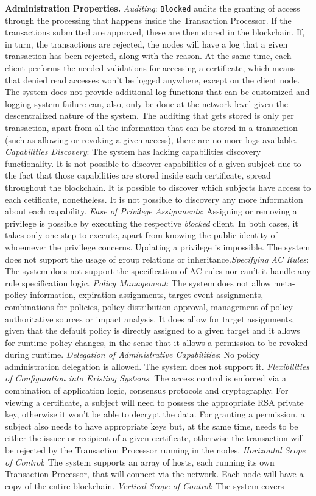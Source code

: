 \textbf{Administration Properties.} \emph{Auditing}: \texttt{Blocked} audits the granting of access through the processing that happens inside the Transaction Processor. If the transactions submitted are approved, these are then stored in the blockchain. If, in turn, the transactions are rejected, the nodes will have a log that a given transaction has been rejected, along with the reason. At the same time, each client performs the needed validations for accessing a certificate, which means that denied read accesses won't be logged anywhere, except on the client node. The system does not provide additional log functions that can be customized and logging system failure can, also, only be done at the network level given the descentralized nature of the system. The auditing that gets stored is only per transaction, apart from all the information that can be stored in a transaction (such as allowing or revoking a given access), there are no more logs available. \emph{Capabilities Discovery}: The system has lacking capabilities discovery functionality. It is not possible to discover capabilities of a given subject due to the fact that those capabilities are stored inside each certificate, spread throughout the blockchain. It is possible to discover which subjects have access to each cetificate, nonetheless. It is not possible to discovery any more information about each capability. \emph{Ease of Privilege Assignments}: Assigning or removing a privilege is possible by executing the respective \emph{blocked} client. In both cases, it takes only one step to execute, apart from knowing the public identity of whoemever the privilege concerns. Updating a privilege is impossible. The system does not support the usage of group relations or inheritance.\emph{Specifying AC Rules}: The system does not support the specification of AC rules nor can't it handle any rule specification logic. \emph{Policy Management}: The system does not allow meta-policy information, expiration assignments, target event assignments, combinations for policies, policy distribution approval, management of policy authoritative sources or impact analysis. It does allow for target assignments, given that the default policy is directly assigned to a given target and it allows for runtime policy changes, in the sense that it allows a permission to be revoked during runtime. \emph{Delegation of Administrative Capabilities}: No policy administration delegation is allowed. The system does not support it. \emph{Flexibilities of Configuration into Existing Systems}: The access control is enforced via a combination of application logic, consensus protocols and cryptography. For viewing a certificate, a subject will need to possess the appropriate RSA private key, otherwise it won't be able to decrypt the data. For granting a permission, a subject also needs to have appropriate keys but, at the same time, needs to be either the issuer or recipient of a given certificate, otherwise the transaction will be rejected by the Transaction Processor running in the nodes. \emph{Horizontal Scope of Control}: The system supports an array of hosts, each running its own Transaction Processor, that will connect via the network. Each node will have a copy of the entire blockchain. \emph{Vertical Scope of Control}: The system covers 